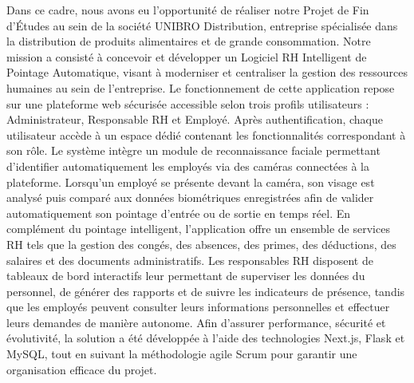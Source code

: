 Dans ce cadre, nous avons eu l’opportunité de réaliser notre Projet de Fin d’Études au sein de la société UNIBRO Distribution, entreprise spécialisée dans la distribution de produits alimentaires et de grande consommation. Notre mission a consisté à concevoir et développer un Logiciel RH Intelligent de Pointage Automatique, visant à moderniser et centraliser la gestion des ressources humaines au sein de l’entreprise. Le fonctionnement de cette application repose sur une plateforme web sécurisée accessible selon trois profils utilisateurs : Administrateur, Responsable RH et Employé. Après authentification, chaque utilisateur accède à un espace dédié contenant les fonctionnalités correspondant à son rôle. Le système intègre un module de reconnaissance faciale permettant d’identifier automatiquement les employés via des caméras connectées à la plateforme. Lorsqu’un employé se présente devant la caméra, son visage est analysé puis comparé aux données biométriques enregistrées afin de valider automatiquement son pointage d’entrée ou de sortie en temps réel. En complément du pointage intelligent, l’application offre un ensemble de services RH tels que la gestion des congés, des absences, des primes, des déductions, des salaires et des documents administratifs. Les responsables RH disposent de tableaux de bord interactifs leur permettant de superviser les données du personnel, de générer des rapports et de suivre les indicateurs de présence, tandis que les employés peuvent consulter leurs informations personnelles et effectuer leurs demandes de manière autonome. Afin d’assurer performance, sécurité et évolutivité, la solution a été développée à l’aide des technologies Next.js, Flask et MySQL, tout en suivant la méthodologie agile Scrum pour garantir une organisation efficace du projet.

